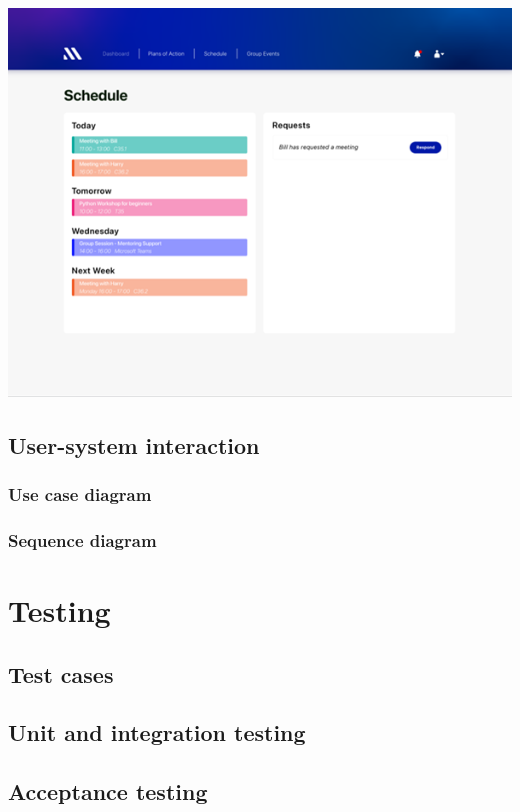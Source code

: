 \documentclass[10pt]{article}
\begin{document}
\includegraphics{Schedule}

\subsection{User-system interaction}
\subsubsection{Use case diagram}
\subsubsection{Sequence diagram}

\section{Testing}
\subsection{Test cases}
\subsection{Unit and integration testing}
\subsection{Acceptance testing}



\end{document}
